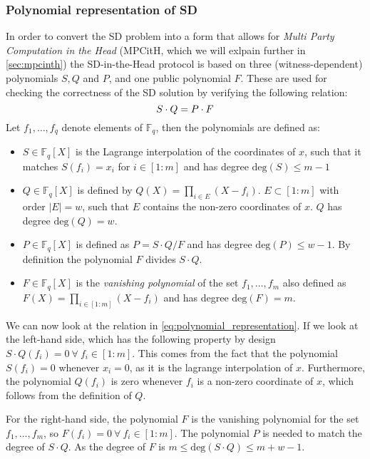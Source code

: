 \documentclass[twoside,11pt]{report}
\theoremstyle{definition}
\theoremstyle{plain}
\begin{document}
\subsubsection{Polynomial representation of SD}\label{sec:polynomial_representation}
In order to convert the SD problem into a form that allows for \textit{Multi Party Computation in the Head} (MPCitH, which we will exlpain further in \autoref{sec:mpcinth}) the SD-in-the-Head protocol is based on three (witness-dependent) polynomials $S, Q$ and $P$, and one public polynomial $F$.
These are used for checking the correctness of the SD solution by verifying the following relation:
\begin{equation}
  \centering
  S\cdot Q = P\cdot F\label{eq:polynomial_representation}
\end{equation}
Let $f_1,\dots, f_q$ denote elements of $\mathbb{F}_q$, then the polynomials are defined as:
\begin{itemize}
  \item $S\in \mathbb{F}_q[X]$ is the Lagrange interpolation of the coordinates of $x$, such that it matches $S(f_i) = x_i$ for $i\in [1:m]$ and has degree $\text{deg}(S) \leq m-1$
  \item $Q\in \mathbb{F}_q[X]$ is defined by $Q(X) = \prod_{i\in E}(X - f_i)$. $E \subset [1:m]$ with order $|E| = w$, such that $E$ contains the non-zero coordinates of $x$. $Q$ has degree $\text{deg}(Q) = w$.
  \item $P\in \mathbb{F}_q[X]$ is defined as $P = S\cdot Q/F$ and has degree $\text{deg}(P) \leq w-1$. By definition the polynomial $F$ divides $S\cdot Q$.
  \item $F\in \mathbb{F}_q[X]$ is the \textit{vanishing polynomial} of the set ${f_1, \dots, f_m}$ also defined as $F(X) = \prod_{i\in [1:m]}(X - f_i)$ and has degree $\text{deg}(F) = m$.
\end{itemize}
We can now look at the relation in \autoref{eq:polynomial_representation}. If we look at the left-hand side, which has the following property by design $S\cdot Q(f_i) = 0 \ \forall\ f_i \in [1:m]$. This comes from the fact that the polynomial $S(f_i) = 0$ whenever $x_i = 0$, as it is the lagrange interpolation of $x$. Furthermore, the polynomial $Q(f_i)$ is zero whenever $f_i$ is a non-zero coordinate of $x$, which follows from the definition of $Q$.

For the right-hand side, the polynomial $F$ is the vanishing polynomial for the set ${f_1, \dots, f_m}$, so $F(f_i) = 0\ \forall\ f_i \in [1:m]$. The polynomial $P$ is needed to match the degree of $S \cdot Q$. As the degree of $F$ is $m \leq \text{deg}(S\cdot Q) \leq m + w - 1$.
\end{document}
